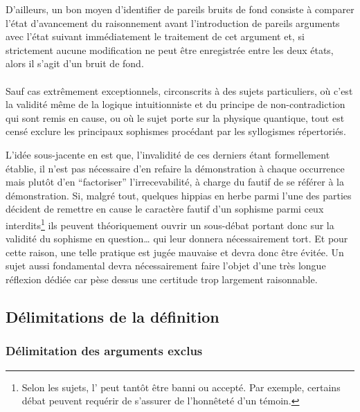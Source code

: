 D’ailleurs, un bon moyen d’identifier de pareils bruits de fond consiste à comparer l’état d’avancement du raisonnement avant l’introduction de pareils arguments avec l’état suivant immédiatement le traitement de cet argument et, si strictement aucune modification ne peut être enregistrée entre les deux états, alors il s’agit d’un bruit de fond.

\paragraph{}
Sauf cas extrêmement exceptionnels, circonscrits à des sujets particuliers, où c’est la validité même de la logique intuitionniste et du principe de non-contradiction qui sont remis en cause, ou où le sujet porte sur la physique quantique, tout \mainabbr{} est censé exclure les principaux sophismes procédant par les syllogismes répertoriés.


L’idée sous-jacente en est que, l’invalidité de ces derniers étant formellement établie, il n’est pas nécessaire d’en refaire la démonstration à chaque occurrence mais plutôt d’en \enquote{factoriser} l’irrecevabilité, à charge du fautif de se référer à la démonstration. Si, malgré tout, quelques hippias en herbe parmi l’une des parties décident de remettre en cause le caractère fautif d’un sophisme parmi ceux interdits\footnote{Selon les sujets, l’ peut tantôt être banni ou accepté. Par exemple, certains débat peuvent requérir de s’assurer de l’honnêteté d’un témoin.} ils peuvent théoriquement ouvrir un sous-débat portant donc sur la validité du sophisme en question… qui leur donnera nécessairement tort. Et pour cette raison, une telle pratique est jugée mauvaise et devra donc être évitée. Un sujet aussi fondamental devra nécessairement faire l’objet d’une très longue réflexion dédiée car pèse dessus une certitude trop largement raisonnable.

\subsection{Délimitations de la définition}
\subsubsection{Délimitation des arguments exclus}
